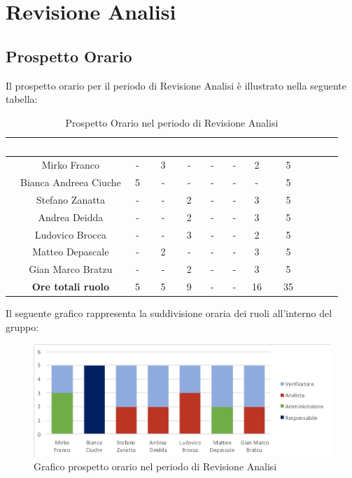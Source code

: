 \newpage
\section{Revisione Analisi}
\subsection{Prospetto Orario}
Il prospetto orario per il periodo di Revisione Analisi è illustrato nella seguente tabella:

\begin{table}[ht]
	\begin{center}
		\begin{tabular}{cccccccccccc}
			\rowcolor{coolblack}
			\hline 
			& \textcolor{white}{Nome} & \textcolor{white}{Re} & \textcolor{white}{Am} & \textcolor{white}{An} & \textcolor{white}{Pt} &\textcolor{white}{Pr} & \textcolor{white}{Ve} & \textcolor{white}{Totale} \\
			\hline
			
			&Mirko Franco          & - & 3 & - & - & - & 2 &5  \\
			&Bianca Andreea Ciuche        & 5  & - & - & - & - & - & 5 \\
			&Stefano Zanatta     & -& - & 2 & - & - & 3&5 \\
			&Andrea Deidda       &  -& - & 2 & - & - & 3 &5 \\
			&Ludovico Brocca    & -& -& 3 & - & - & 2 & 5 \\
			&Matteo Depascale  & -& 2& -& - & - & 3 & 5 \\
			&Gian Marco Bratzu & -& - & 2 & - & - & 3& 5 \\
			\hline
			&\textbf{Ore totali ruolo} & 5 & 5 & 9 & - & - & 16 & 35 \\
		\end{tabular}
		\caption{Prospetto Orario nel periodo di Revisione Analisi}
	\end{center}
\end{table}

Il seguente grafico rappresenta la suddivisione oraria dei ruoli all'interno del gruppo:
\begin{figure}[!ht]
	\begin{center}
		\includegraphics{images/grafoProspettoOrarioDett.png}
		\caption{Grafico prospetto orario nel periodo di Revisione Analisi }
	\end{center}
\end{figure}
\newpage
